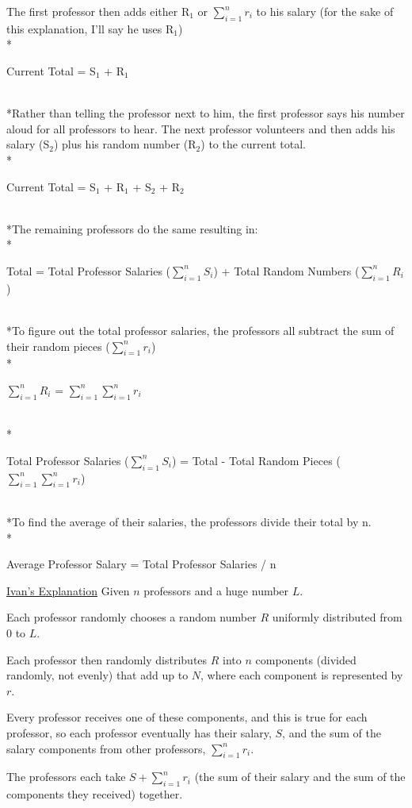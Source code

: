 \documentclass[12pt]{article}
\begin{document}
\begin{enumerate}[(a)]
The first professor then adds either R$_1$ or $\sum_{i=1}^{n} r_{i}$ to his salary (for the sake of this explanation, I'll say he uses R$_1$)
\smallskip
\\*\centerline{Current Total = S$_1$ + R$_1$}
\smallskip 
\\*Rather than telling the professor next to him, the first professor says his number aloud for all professors to hear. The next professor volunteers and then adds his salary (S$_2$) plus his random number (R$_2$) to the current total.
\\*\centerline{Current Total = S$_1$ + R$_1$ + S$_2$ + R$_2$}
\smallskip
\\*The remaining professors do the same resulting in:
\smallskip
\\*\centerline{Total = Total Professor Salaries ($\sum_{i=1}^{n} S_{i}$) + Total Random Numbers ($\sum_{i=1}^{n} R_{i}$)}
\smallskip
\\*To figure out the total professor salaries, the professors all subtract the sum of their random pieces ($\sum_{i=1}^{n} r_{i}$)
\\*\centerline{$\sum_{i=1}^{n} R_{i}$ = $\sum_{i=1}^{n}\sum_{i=1}^{n} r_{i}$}
\smallskip
\\*\centerline{Total Professor Salaries ($\sum_{i=1}^{n} S_{i}$) = Total - Total Random Pieces ($\sum_{i=1}^{n}\sum_{i=1}^{n} r_{i}$)}
\smallskip
\\*To find the average of their salaries, the professors divide their total by n.
\smallskip
\\*\centerline{Average Professor Salary = Total Professor Salaries / n}
\newpage
\uline{Ivan's Explanation}
Given $n$ professors and a huge number $L$.\newline

Each professor randomly chooses a random number $R$ uniformly distributed from 0 to $L$.\newline

Each professor then randomly distributes $R$ into $n$ components (divided randomly, not evenly) that add up to $N$, where each component is represented by $r$.\newline

Every professor receives one of these components, and this is true for each professor, so each professor eventually has their salary, $S$, and the sum of the salary components from other professors, $\sum_{i=1}^{n} r_i$.\newline

The professors each take $S+\sum_{i=1}^{n} r_i$ (the sum of their salary and the sum of the components they received) together. \newline


\end{enumerate}
\end{document}
